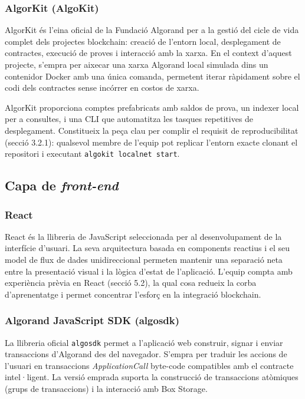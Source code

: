 \subsubsection{AlgorKit (AlgoKit)}
 
AlgorKit és l'eina oficial de la Fundació Algorand per a la gestió del cicle de vida complet dels projectes blockchain: creació de l'entorn local, desplegament de contractes, execució de proves i interacció amb la xarxa. En el context d'aquest projecte, s'empra per aixecar una xarxa Algorand local simulada dins un contenidor Docker amb una única comanda, permetent iterar ràpidament sobre el codi dels contractes sense incórrer en costos de xarxa.
 
AlgorKit proporciona comptes prefabricats amb saldos de prova, un indexer local per a consultes, i una CLI que automatitza les tasques repetitives de desplegament. Constitueix la peça clau per complir el requisit de reproducibilitat (secció 3.2.1): qualsevol membre de l'equip pot replicar l'entorn exacte clonant el repositori i executant \texttt{algokit localnet start}.
 
\subsection{Capa de \textit{front-end}}
 
\subsubsection{React}
 
React és la llibreria de JavaScript seleccionada per al desenvolupament de la interfície d'usuari. La seva arquitectura basada en components reactius i el seu model de flux de dades unidireccional permeten mantenir una separació neta entre la presentació visual i la lògica d'estat de l'aplicació. L'equip compta amb experiència prèvia en React (secció 5.2), la qual cosa redueix la corba d'aprenentatge i permet concentrar l'esforç en la integració blockchain.
 

\subsubsection{Algorand JavaScript SDK (algosdk)}
 
La llibreria oficial \texttt{algosdk} permet a l'aplicació web construir, signar i enviar transaccions d'Algorand des del navegador. S'empra per traduir les accions de l'usuari en transaccions \textit{ApplicationCall} byte-code compatibles amb el contracte intel·ligent. La versió emprada suporta la construcció de transaccions atòmiques (grups de transaccions) i la interacció amb Box Storage.
 

